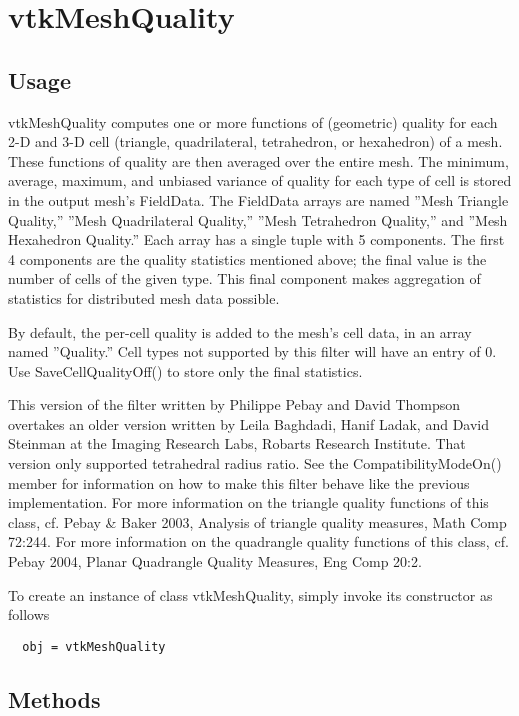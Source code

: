\section{vtkMeshQuality}

\subsection{Usage}

 vtkMeshQuality computes one or more functions of (geometric)
 quality for each 2-D and 3-D cell (triangle, quadrilateral, tetrahedron,
 or hexahedron) of a mesh. These functions of quality are then averaged
 over the entire mesh. The minimum, average, maximum, and unbiased variance
 of quality for each type of cell is stored in the output mesh's FieldData.
 The FieldData arrays are named ''Mesh Triangle Quality,''
 ''Mesh Quadrilateral Quality,'' ''Mesh Tetrahedron Quality,''
 and ''Mesh Hexahedron Quality.'' Each array has a single tuple
 with 5 components. The first 4 components are the quality statistics
 mentioned above; the final value is the number of cells of the given type.
 This final component makes aggregation of statistics for distributed
 mesh data possible.

 By default, the per-cell quality is added to the mesh's cell data, in
 an array named ''Quality.'' Cell types not supported by
 this filter will have an entry of 0. Use SaveCellQualityOff() to
 store only the final statistics.

 This version of the filter written by Philippe Pebay and David Thompson
 overtakes an older version written by Leila Baghdadi, Hanif Ladak, and 
 David Steinman at the Imaging Research Labs, Robarts Research Institute.
 That version only supported tetrahedral radius ratio. See the 
 CompatibilityModeOn() member for information on how to make this filter 
 behave like the previous implementation.
 For more information on the triangle quality functions of this class, cf.
 Pebay \& Baker 2003, Analysis of triangle quality measures, Math Comp 72:244.
 For more information on the quadrangle quality functions of this class, cf.
 Pebay 2004, Planar Quadrangle Quality Measures, Eng Comp 20:2.


To create an instance of class vtkMeshQuality, simply
invoke its constructor as follows
\begin{verbatim}
  obj = vtkMeshQuality
\end{verbatim}
\subsection{Methods}

